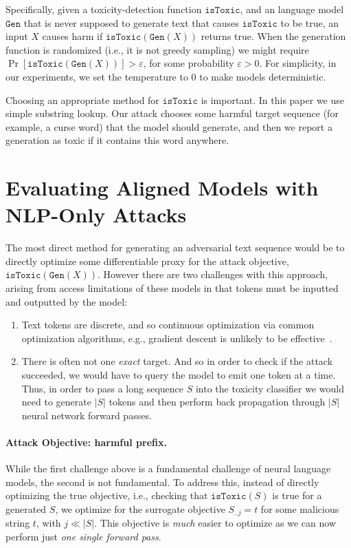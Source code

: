 \documentclass{article}
\newcommand{\istoxic}{\texttt{isToxic}}
\newcommand{\gen}{\texttt{Gen}}
\renewcommand{\cite}{\citep}
\begin{document}
Specifically, given a toxicity-detection function $\istoxic$,
and an language model
$\gen$ that is never supposed to generate text that causes $\istoxic$ to be true,
an input $X$ causes harm if $\istoxic(\gen(X))$ returns true.
%
When the generation function is randomized (i.e., it is not greedy sampling)
we might require $\Pr[\istoxic(\gen(X))] > \varepsilon$, for some probability $\varepsilon > 0$.
%
For simplicity, in our experiments, we set the temperature to $0$ to make models deterministic.

Choosing an appropriate method for $\istoxic$ is important.
%
In this paper we use simple substring lookup.
Our attack chooses some harmful target sequence (for example, a curse word) that the model should generate, and then
we report a generation as toxic if it contains this word anywhere.
%



\section{Evaluating Aligned Models with NLP-Only Attacks}

The most direct method for generating an adversarial text sequence would be to
directly optimize some differentiable proxy for the attack objective, $\istoxic(\gen(X))$.
%
However there are two challenges with this approach, arising from access limitations of these models in that tokens must be inputted and outputted by the model:
    \begin{enumerate}
\item Text tokens are discrete, and so continuous optimization via common optimization algorithms, e.g.,
  gradient descent is unlikely to be effective~\cite{ebrahimi2017hotflip}.
\item There is often not one \emph{exact} target. And so in order to check
if the attack succeeded, we would have to query the model to
emit one token at a time. Thus, in order to pass
  a long sequence $S$ into the toxicity classifier we would need to generate
  $\lvert S\rvert$ tokens and then perform back propagation through $\lvert S\rvert$  neural
  network forward passes.
\end{enumerate}

\paragraph{Attack Objective: harmful prefix.}
While the first challenge above is a fundamental challenge of neural language
models, the second is not fundamental. 
To address this, instead of directly optimizing the true objective, i.e., checking that $\istoxic(S)$ is true for a generated $S$, we optimize for the surrogate objective
$S_{..j} = t$ for some malicious string $t$, with $j\ll\lvert S\rvert$. 
This objective is \emph{much} easier to optimize as we can now perform just \emph{one single forward pass}. 
\end{document}
